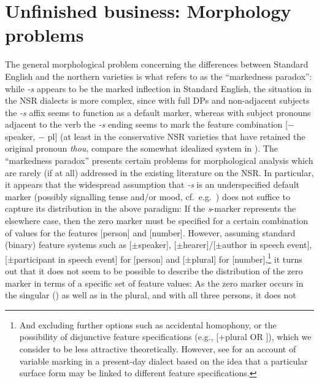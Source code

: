 \documentclass[output=paper]{langsci/langscibook}
\begin{document}
\section{Unfinished business: Morphology problems}
\label{sec:post-synt-appr}

The general morphological problem concerning the differences between Standard
English and the northern varieties is what \citet{Pietsch:2005b} refers to as
the ``markedness paradox'': while \emph{-s} appears to be the marked inflection
in Standard English, the situation in the \gls{NSR}
dialects is more complex,
since with full DPs and non-adjacent subjects the \emph{-s} affix seems to
function as a default marker, whereas with subject pronouns adjacent to the verb
the \emph{-s} ending seems to mark the feature combination [$-$ speaker, $-$ pl] (at
least in the conservative \gls{NSR} varieties that have retained the original
\Ssg{} pronoun \emph{thou}, compare the somewhat idealized system in ). The ``markedness paradox'' presents certain problems for morphological
analysis which are rarely (if at all) addressed in the existing literature on
the \gls{NSR}. In particular, it appears that the widespread assumption that
\emph{-s} is an underspecified default marker (possibly signalling tense and/or
mood, cf.\ e.g.\
\citealt{Henry:1995,Pietsch:2005b,deHaas:2011,deHaasandvanKemenade:2015}) does not suffice to capture its distribution in the above
paradigm: If the \emph{s}-marker represents the elsewhere\is{elsewhere condition} case, then the
zero marker must be specified for a certain combination of values for the
features [person] and [number]. However, assuming standard (binary) feature
systems such as [$\pm$speaker], [$\pm$hearer]/[$\pm$author in speech event],
[$\pm$participant in speech event] for [person] and [$\pm$plural] for
[number],\footnote{And excluding further options such as accidental homophony,
    or the possibility of disjunctive feature specifications  (e.g., [$+$plural OR
    \Fsg]), which we consider to be less attractive theoretically. However, see
    \textcite{AdgerSmith2010} for an account of variable \isi{agreement} marking in a
    present-day dialect based on the idea that a particular surface form may be
linked to different feature specifications.} it turns out that it does not seem
to be possible to describe the distribution of the zero marker in terms of a
specific set of feature values: As the zero marker occurs in the singular
(\Fsg{}) as well as in the plural, and with all three persons, it does not
\end{document}
